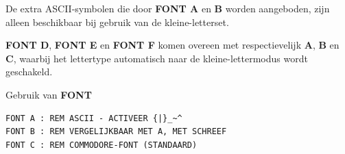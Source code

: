 \begin{description}[leftmargin=2cm,style=nextline]
\item [Opmerkingen:]  De extra ASCII-symbolen die door {\bf FONT A} en {\bf B} worden aangeboden, zijn alleen beschikbaar bij gebruik van de kleine-letterset.

                  {\bf FONT D}, {\bf FONT E} en {\bf FONT F} komen overeen met respectievelijk {\bf A}, {\bf B} en {\bf C}, waarbij het lettertype automatisch naar de kleine-lettermodus wordt geschakeld.

\item [Voorbeelden:] Gebruik van {\bf FONT}

\begin{tcolorbox}[colback=black,coltext=white]
\verbatimfont{\codefont}
\begin{verbatim}
FONT A : REM ASCII - ACTIVEER {|}_~^
FONT B : REM VERGELIJKBAAR MET A, MET SCHREEF
FONT C : REM COMMODORE-FONT (STANDAARD)
\end{verbatim}
\end{tcolorbox}
\end{description}


\newpage
